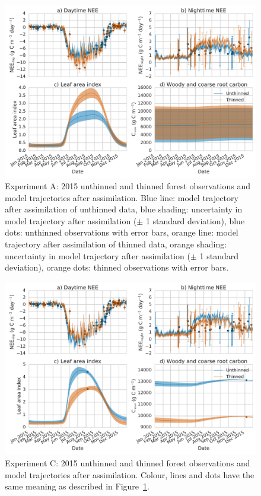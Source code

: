 \documentclass[draft,linenumbers]{agujournal}
\begin{document}
\begin{figure}[ht]
    \centering
        \includegraphics[width=\textwidth]{obs_compa.pdf}
\caption{Experiment A: 2015 unthinned and thinned forest observations and model trajectories after assimilation. Blue line: model trajectory after assimilation of unthinned data, blue shading: uncertainty in model trajectory after assimilation (\(\pm\) 1 standard deviation), blue dots: unthinned observations with error bars, orange line: model trajectory after assimilation of thinned data, orange shading: uncertainty in model trajectory after assimilation (\(\pm\) 1 standard deviation), orange dots: thinned observations with error bars.}
 \label{fig:obscompa}
 \end{figure}
 
 
 \begin{figure}[ht]
    \centering
        \includegraphics[width=\textwidth]{obs_compc.pdf}
\caption{Experiment C: 2015 unthinned and thinned forest observations and model trajectories after assimilation. Colour, lines and dots have the same meaning as described in Figure~\ref{fig:obscompa}.}
 \label{fig:obscompc}
 \end{figure}
\end{document}
